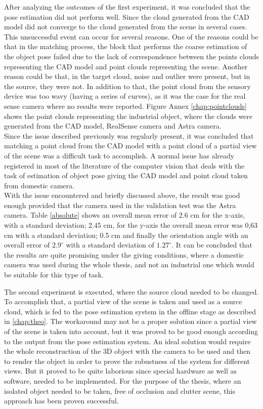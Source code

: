 After analyzing the outcomes of the first experiment, it was concluded that the pose estimation did not perform well. Since the cloud generated from the CAD model did not converge to the cloud generated from the scene in several cases. This unsuccessful event can occur for several reasons. One of the reasons could be that in the matching process, the block that performs the coarse estimation of the object pose failed due to the lack of correspondence between the points clouds representing the CAD model and point clouds representing the scene. Another reason could be that, in the target cloud, noise and outlier were present, but in the source, they were not. In addition to that, the point cloud from the sensory device was too wavy (having a series of curves), as it was the case for the real sense camera where no results were reported. Figure Annex \ref{chap:pointclouds} shows the point clouds representing the industrial object, where the clouds were generated from the CAD model, RealSense camera and Astra camera.\\
Since the issue described previously was regularly present, it was concluded that matching a point cloud from the CAD model with a point cloud of a partial view of the scene was a difficult task to accomplish. A normal issue has already registered in most of the literature of the computer vision that deals with the task of estimation of object pose giving the CAD model and point cloud taken from domestic camera.	\\ 
With the issue encountered and briefly discussed above, the result was good enough provided that the camera used in the validation test was the Astra camera. Table \ref{absolute} shows an overall mean error of 2.6 cm for the x-axis, with a standard deviation; 2.45 cm, for the y-axis the overall mean error was 0,63 cm with a standard deviation; 0.5 cm and finally the orientation angle with an overall error of $2.9^{\circ}$ with a standard deviation of $1.27^{\circ}$. It can be concluded that the results are quite promising under the giving conditions, where a domestic camera was used during the whole thesis, and not an industrial one which would be suitable for this type of task. 

The second experiment is executed, where the source cloud needed to be changed. To accomplish that, a partial view of the scene is taken and used as a source cloud, which is fed to the pose estimation system in the offline stage as described in \ref{chap:theo}. The workaround may not be a proper solution since a partial view of the scene is taken into account, but it was proved to be good enough according to the output from the pose estimation system. An ideal solution would require the whole reconstruction of the 3D object with the camera to be used and then to render the object in order to prove the robustness of the system for different views. But it proved to be quite laborious since special hardware as well as software, needed to be implemented. For the purpose of the thesis, where an isolated object needed to be taken, free of occlusion and clutter scene, this approach has been proven successful.

